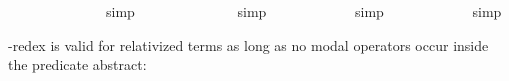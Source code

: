 \begin{isabellebody}
\begin{isamarkuptext}
\end{isamarkuptext}\isamarkuptrue%
\ \isamarkupfalse%
\ {\isachardoublequoteopen}{\isasymlfloor}{\isacharparenleft}{\isacharparenleft}{\isasymlambda}{\isasymalpha}{\isachardot}\ {\isasymphi}\ {\isasymalpha}{\isacharparenright}\ \ {\isacharparenleft}{\isasymtau}{\isacharcolon}{\isacharcolon}{\isasymup}{\isasymzero}{\isacharparenright}{\isacharparenright}\ \isactrlbold {\isasymleftrightarrow}\ {\isacharparenleft}{\isasymphi}\ \ {\isasymtau}{\isacharparenright}{\isasymrfloor}{\isachardoublequoteclose}%
\ %
%
\isamarkupfalse%
\ simp%
%
%
\isanewline
\ \isamarkupfalse%
\ {\isachardoublequoteopen}{\isasymlfloor}{\isacharparenleft}{\isacharparenleft}{\isasymlambda}{\isasymalpha}{\isachardot}\ {\isasymphi}\ {\isasymalpha}{\isacharparenright}\ \ {\isacharparenleft}{\isasymtau}{\isacharcolon}{\isacharcolon}{\isasymzero}{\isacharparenright}{\isacharparenright}\ \isactrlbold {\isasymleftrightarrow}\ {\isacharparenleft}{\isasymphi}\ \ {\isasymtau}{\isacharparenright}{\isasymrfloor}{\isachardoublequoteclose}%
\ %
%
\isamarkupfalse%
\ simp%
%
%
\isanewline
\ \isamarkupfalse%
\ {\isachardoublequoteopen}{\isasymlfloor}{\isacharparenleft}{\isacharparenleft}{\isasymlambda}{\isasymalpha}{\isachardot}\ \isactrlbold {\isasymbox}{\isasymphi}\ {\isasymalpha}{\isacharparenright}\ {\isacharparenleft}{\isasymtau}{\isacharcolon}{\isacharcolon}{\isasymup}{\isasymzero}{\isacharparenright}{\isacharparenright}\ \isactrlbold {\isasymleftrightarrow}\ {\isacharparenleft}\isactrlbold {\isasymbox}{\isasymphi}\ {\isasymtau}{\isacharparenright}{\isasymrfloor}{\isachardoublequoteclose}%
\ %
%
\isamarkupfalse%
\ simp%
%
%
\isanewline
\ \isamarkupfalse%
\ {\isachardoublequoteopen}{\isasymlfloor}{\isacharparenleft}{\isacharparenleft}{\isasymlambda}{\isasymalpha}{\isachardot}\ \isactrlbold {\isasymbox}{\isasymphi}\ {\isasymalpha}{\isacharparenright}\ {\isacharparenleft}{\isasymtau}{\isacharcolon}{\isacharcolon}{\isasymzero}{\isacharparenright}{\isacharparenright}\ \isactrlbold {\isasymleftrightarrow}\ {\isacharparenleft}\isactrlbold {\isasymbox}{\isasymphi}\ {\isasymtau}{\isacharparenright}{\isasymrfloor}{\isachardoublequoteclose}%
\ %
%
\isamarkupfalse%
\ simp%
%
%
%
\begin{isamarkuptext}%
\isa{{\isasymbeta}{\isasymeta}}-redex is valid for relativized terms as long as no modal operators occur inside the predicate abstract:%
\end{isamarkuptext}\isamarkuptrue%

\end{isabellebody}
